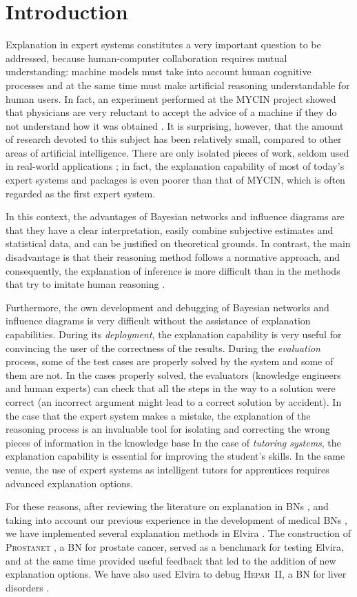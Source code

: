 \section{Introduction}

Explanation in expert systems constitutes a very important
question to be addressed, because human-computer collaboration
requires mutual understanding: machine models must take into
account human cognitive processes and at the same time must make
artificial reasoning understandable for human users. In fact, an
experiment performed at the MYCIN project showed that physicians
are very reluctant to accept the advice of a machine if they do
not understand how it was obtained \cite{teach84}. It is
surprising, however, that the amount of research devoted to this
subject has been relatively small, compared to other areas of
artificial intelligence. There are only isolated pieces of work,
seldom used in real-world applications \cite{lacave04}; in fact,
the explanation capability of most of today's expert systems and
packages is even poorer than that of MYCIN, which is often
regarded as the first expert system.

In this context, the advantages of Bayesian networks and influence
diagrams are that they have a clear interpretation, easily combine
subjective estimates and statistical data, and can be justified on
theoretical grounds. In contrast, the main disadvantage is that
their reasoning method follows a normative approach, and
consequently, the explanation of inference is more difficult than
in the methods that try to imitate human reasoning
\cite{Druzdzel93a}.

Furthermore, the own development and debugging of Bayesian
networks and influence diagrams is very difficult without the
assistance of explanation capabilities. During its
\emph{deployment}, the explanation capability is very useful for
convincing the user of the correctness of the results. During the
\emph{evaluation} process, some of the test
cases are properly solved by the system and some of them are not.
In the cases properly solved, the evaluators (knowledge engineers
and human experts) can check that all the steps in the way to a
solution were correct (an incorrect argument might lead to a
correct solution by accident). In the case that the expert system
makes a mistake, the explanation of the reasoning process is an
invaluable tool for isolating and correcting the wrong pieces of
information in the knowledge base In the case of \emph{tutoring
systems}, the explanation capability is essential for improving
the student's skills. In the same venue, the use of expert systems
as intelligent tutors for apprentices requires advanced
explanation options.

For these reasons, after reviewing the literature on explanation
in BNs \cite{lacave02}, and taking into account our previous
experience in the development of medical BNs \cite{Diez94,
lacave98b}, we have implemented several explanation methods in
Elvira \cite{elvira02}. The construction of \textsc{Prostanet}
\cite{lacave03}, a BN for prostate cancer, served as a benchmark
for testing Elvira, and at the same time provided useful feedback
that led to the addition of new explanation options. We have also
used Elvira to debug \textsc{Hepar~II}, a BN for liver disorders
\cite{onisko00}.
